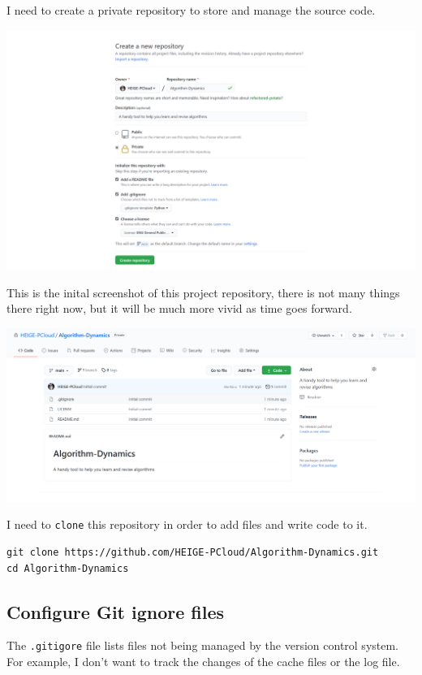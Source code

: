 \documentclass[a4paper]{report}
\begin{document}
I need to create a private repository to store and manage the source code.

\includegraphics[width=\linewidth]{Create-a-New-Repository}

This is the inital screenshot of this project repository, there is not many things there right now, but it will be much more vivid as time goes forward.

\includegraphics[width=\linewidth]{HEIGE-PCloud-Algorithm-Dynamics-A-handy-tool-to-help-you-learn-and-revise-algorithms}

I need to \texttt{clone} this repository in order to add files and write code to it.

\begin{verbatim}
git clone https://github.com/HEIGE-PCloud/Algorithm-Dynamics.git
cd Algorithm-Dynamics
\end{verbatim}

\subsection{Configure Git ignore files}

The \texttt{.gitigore} file lists files not being managed by the version control system. For example, I don't want to track the changes of the cache files or the log file.
\end{document}
